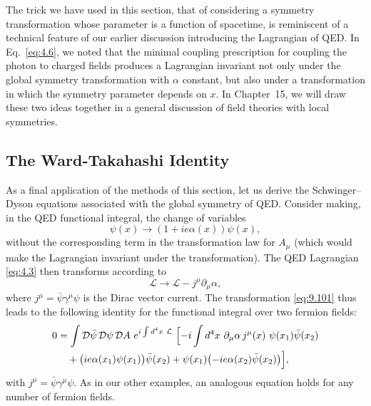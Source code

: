 The trick we have used in this section, that of considering a symmetry
transformation whose parameter is a function of spacetime, is reminiscent of a
technical feature of our earlier discussion introducing the Lagrangian of QED.
In Eq.~\eqref{eq:4.6}, we noted that the minimal coupling prescription for
coupling the photon to charged fields produces a Lagrangian invariant not only
under the global symmetry transformation with $\alpha$ constant, but also
under a transformation in which the symmetry parameter depends on $x$.  In
Chapter~15, we will draw these two ideas together in a general discussion of
field theories with local symmetries.

\subsection{The Ward-Takahashi Identity}

As a final application of the methods of this section, let us derive the
Schwinger--Dyson equations associated with the global symmetry of QED.
Consider making, in the QED functional integral, the change of variables
\begin{equation}
  \psi(x) \to (1 + ie\alpha(x))\psi(x),
  \label{eq:9.101}
\end{equation}
without the corresponding term in the transformation law for $A_\mu$ (which
would make the Lagrangian invariant under the transformation).  The QED
Lagrangian \eqref{eq:4.3} then transforms according to
\begin{equation}
  \mathcal{L} \to \mathcal{L} - j^\mu\partial_\mu\alpha ,
  \label{eq:9.102}
\end{equation}
where $j^\mu = \bar{\psi}\gamma^\mu\psi$ is the Dirac vector current.  The
transformation \eqref{eq:9.101} thus leads to the following identity for the
functional integral over two fermion fields:
\begin{equation}
  \begin{aligned}
    0 &= \int \mathcal{D}\bar{\psi}\,\mathcal{D}\psi\,\mathcal{D}A\
      e^{i\int d^4x\ \mathcal{L}}\ \Bigl[ -i\int d^4x\ \partial_\mu\alpha\,
      j^\mu(x)\ \psi(x_1)\bar{\psi}(x_2)\\
    &\quad + \bigl( ie\alpha(x_1)\psi(x_1) \bigr)\bar{\psi}(x_2)
      + \psi(x_1)\bigl( -ie\alpha(x_2)\bar{\psi}(x_2) \bigr) \Bigr] ,
  \end{aligned}
  \label{eq:9.103}
\end{equation}
with $j^\mu = \bar{\psi}\gamma^\mu\psi$.  As in our other examples, an analogous
equation holds for any number of fermion fields.

